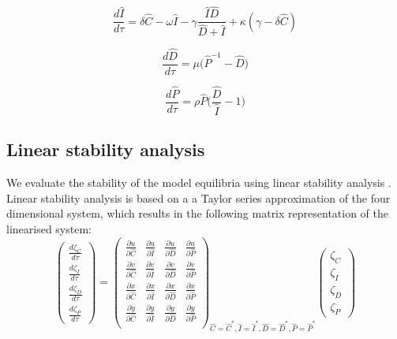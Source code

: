 \documentclass[9pt,twoside,lineno]{pnas-new}
\begin{document}
\begin{equation}
  \frac{d\hat{I}}{d\tau} = \delta \hat{C} - \omega \hat{I} - \gamma \frac{\hat{I}\hat{D}}{\hat{D} + \hat{I}} + \kappa ( \gamma - \delta \hat{C})
\end{equation}

\begin{equation}
  \frac{d\hat{D}}{d\tau } = \mu \Big( \hat{P}^{-1} - \hat{D}\Big)
\end{equation}

\begin{equation}
  \frac{d\hat{P}}{d\tau} = \rho \hat{P}\Big(\frac{\hat{D}}{\hat{I}} - 1\Big)
\end{equation}

\subsection*{Linear stability analysis}  
We evaluate the stability of the model equilibria using linear stability analysis \cite{strogatz1994}. Linear stability analysis is based on a a Taylor series approximation of the four dimensional system, which results in the following matrix representation of the linearised system:
%
\begin{equation}
  \begin{pmatrix}
    \frac{d\zeta_{C}}{d\tau} \\
    \frac{d\zeta_{I}}{d\tau} \\
    \frac{d\zeta_{D}}{d\tau} \\
    \frac{d\zeta_{P}}{d\tau}
  \end{pmatrix}
  =
  \begin{pmatrix}
    \frac{\partial u}{\partial \hat{C}} & \frac{\partial u}{\partial \hat{I}} & \frac{\partial u}{\partial \hat{D}} & \frac{\partial u}{\partial \hat{P}}\\
    \frac{\partial v}{\partial \hat{C}} & \frac{\partial v}{\partial \hat{I}} & \frac{\partial v}{\partial \hat{D}} & \frac{\partial v}{\partial \hat{P}}\\
    \frac{\partial x}{\partial \hat{C}} & \frac{\partial x}{\partial \hat{I}} & \frac{\partial x}{\partial \hat{D}} & \frac{\partial x}{\partial \hat{P}}\\
    \frac{\partial y}{\partial \hat{C}} & \frac{\partial y}{\partial \hat{I}} & \frac{\partial y}{\partial \hat{D}} & \frac{\partial y}{\partial \hat{P}}\\
  \end{pmatrix}_{\hat{C}=\hat{C}^{*}, \hat{I}=\hat{I}^{*}, \hat{D}=\hat{D}^{*}, \hat{P}=\hat{P}^{*}}
  \begin{pmatrix}
    \zeta_{C} \\
    \zeta_{I}  \\
    \zeta_{D}  \\
    \zeta_{P}
  \end{pmatrix}
\end{equation}
\end{document}
